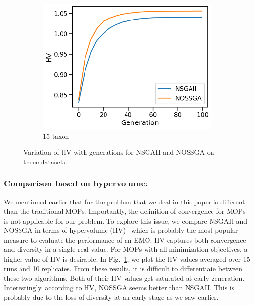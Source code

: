 \begin{figure}[!htbp]
\begin{adjustwidth}{-1cm}{-1cm}
\begin{subfigure}[b]{0.4\textwidth}
			\includegraphics[width=\textwidth]{Figure/15-taxon_hv}
			\caption{15-taxon}
		\end{subfigure}
		\caption{Variation of HV with generations for NSGAII and NOSSGA on three datasets.}
		\label{fig:gen_wise_hv}
	\end{adjustwidth}
\end{figure}
\subsubsection{Comparison based on hypervolume:} We mentioned earlier that for the problem that we deal in this paper is different than the traditional MOPs. Importantly, the definition of convergence for MOPs is not applicable for our problem. To explore this issue, we compare NSGAII and NOSSGA in terms of hypervolume (HV)~\cite{zitzler1999multiobjective} which is probably the most popular measure to evaluate the performance of an EMO. HV captures both convergence and diversity in a single real-value. For MOPs with all minimization objectives, a higher value of HV is desirable. In Fig.~\ref{fig:gen_wise_hv}, we plot the HV values averaged over 15 runs and 10 replicates. From these results, it is difficult to differentiate between these two algorithms. Both of their HV values get saturated at early generation. Interestingly, according to HV, NOSSGA seems better than NSGAII. This is probably due to the loss of diversity at an early stage as we saw earlier. 

